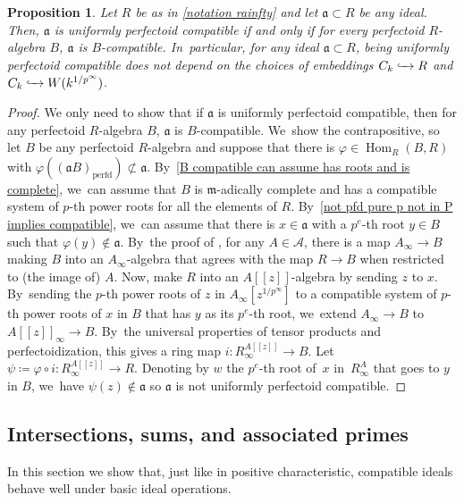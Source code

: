 \documentclass[11pt]{article}
\let\autoref\cref
\theoremstyle{plain}
\newtheorem{proposition}[theorem]{Proposition}
\theoremstyle{definition}
\numberwithin{equation}{theorem}
\newcommand{\fra}{\mathfrak{a}}
\newcommand{\fram}{\mathfrak{m}}
\DeclareMathOperator{\Hom}{Hom}
\newcommand{\perfd}{_{\mathrm{perfd}}}
\newcommand{\llbracket}{[\![}
\newcommand{\rrbracket}{]\!]}
\newcommand{\into}[1][]{\lhook \joinrel \xrightarrow{\ #1\ }}
\newcommand{\nsubset}{\not\subset}
\newcommand{\sA}{\mathcal{A}}
\newcommand{\pe}{{p^e}}
\renewcommand{\phi}{\varphi}
\newcommand{\unpfty}{{1/p^\infty}}
\newcommand{\rafty}{R^A_\infty}
\begin{document}
\begin{proposition}\label{uniformly perfd compatible does not depend on choice of embedding}
Let $R$ be as in \autoref{notation rainfty} and let $\fra\subset R$ be any ideal. Then, $\fra$ is uniformly perfectoid compatible if and only if for every perfectoid $R$\nobreakdash-algebra $B$, $\fra$ is $B$-compatible. In~particular, for any ideal $\fra\subset R$, being uniformly perfectoid compatible does not depend on the choices of embeddings $C_k\into R$ and $C_k\into W(k^\unpfty)$.
\end{proposition}

\begin{proof}
We only need to show that if $\fra$ is uniformly perfectoid compatible, then for any perfectoid $R$\nobreakdash-algebra $B$, $\fra$ is $B$-compatible. We~show the contrapositive, so let $B$ be any perfectoid $R$\nobreakdash-algebra and suppose that there is $\phi\in \Hom_R(B,R)$ with $\phi( (\fra B)\perfd)\nsubset \fra$. By~\autoref{B compatible can assume has roots and is complete}, we~can assume that $B$ is $\fram$-adically complete and has a compatible system of $p$-th power roots for all the elements of $R$. By~\autoref{not pfd pure p not in P implies compatible}, we~can assume that there is $x\in \fra$ with a $p^e$-th root $y\in B$ such that $\phi(y)\notin\fra$. By~the proof of \cite[Lem.\,4.23]{BMPSTWWPerfectoidPure}, for any $A\in \sA$, there is a map $A_\infty\to B$ making $B$ into an $A_\infty$-algebra that agrees with the map $R\to B$ when restricted to (the image of) $A$. Now, make $R$ into an $A\llbracket z\rrbracket$-algebra by sending $z$ to $x$. By~sending the $p$-th power roots of $z$ in $A_\infty [ z^{\unpfty} ]$ to a compatible system of $p$-th power roots of $x$ in $B$ that has $y$ as its $p^e$-th root, we~extend $A_\infty\to B$ to $A\llbracket z \rrbracket_\infty \to B$. By~the universal properties of tensor products and perfectoidization, this gives a ring map $i\colon R^{A\llbracket z \rrbracket}_\infty \to B$. Let $\psi\coloneqq \phi\circ i\colon R^{A\llbracket z \rrbracket}_\infty\to R$. Denoting by $w$ the $\pe$-th root of~$x$ in~$\rafty$ that goes to $y$ in $B$, we~have $\psi(z)\notin \fra$ so $\fra$ is not uniformly perfectoid compatible.
\end{proof}

\subsection{Intersections, sums, and associated primes} In this section we show that, just like in positive characteristic, compatible ideals behave well under basic ideal operations.
\end{document}
